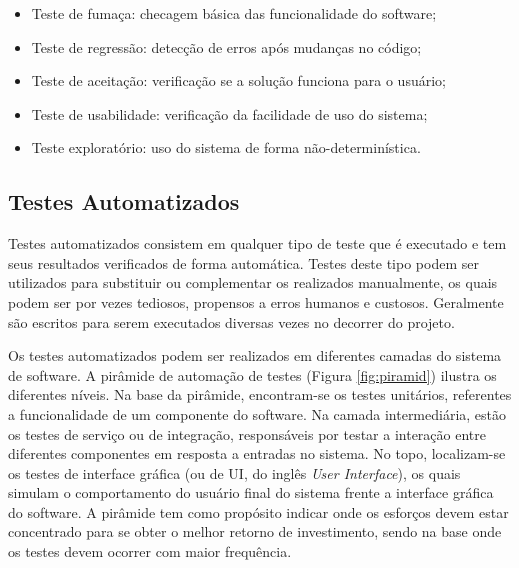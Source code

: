 \begin{itemize}
    \item Teste de fumaça: checagem básica das funcionalidade do software;
    \item Teste de regressão: detecção de erros após mudanças no código;
    \item Teste de aceitação: verificação se a solução funciona para o usuário;
    \item Teste de usabilidade: verificação da facilidade de uso do sistema;
    \item Teste exploratório: uso do sistema de forma não-determinística.
\end{itemize}

\subsection{Testes Automatizados}
Testes automatizados consistem em qualquer tipo de teste que é executado e tem seus resultados verificados de forma automática. Testes deste tipo podem ser utilizados para substituir ou complementar os realizados manualmente, os quais podem ser por vezes tediosos, propensos a erros humanos e custosos. Geralmente são escritos para serem executados diversas vezes no decorrer do projeto.

Os testes automatizados podem ser realizados em diferentes camadas do sistema de software. A pirâmide de automação de testes \cite{test-pyramid} (Figura \ref{fig:piramid}) ilustra os diferentes níveis. Na base da pirâmide, encontram-se os testes unitários, referentes a funcionalidade de um componente do software. Na camada intermediária, estão os testes de serviço ou de integração, responsáveis por testar a interação entre diferentes componentes em resposta a entradas no sistema. No topo, localizam-se os testes de interface gráfica (ou de UI, do inglês \textit{User Interface}), os quais simulam o comportamento do usuário final do sistema frente a interface gráfica do software. A pirâmide tem como propósito indicar onde os esforços devem estar concentrado para se obter o melhor retorno de investimento, sendo na base onde os testes devem ocorrer com maior frequência.

